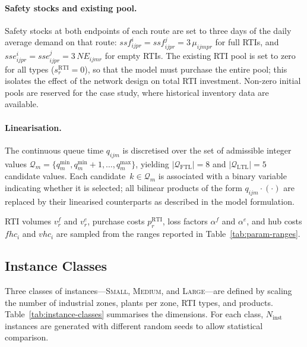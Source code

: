 \paragraph{Safety stocks and existing pool.}
Safety stocks at both endpoints of each route are set to three days
of the daily average demand on that route: $ssf^{i}_{ijpr} =
ssf^{j}_{ijpr} = 3\,\mu_{ijmpr}$ for full RTIs, and
$sse^{i}_{ijpr} = sse^{j}_{ijpr} = 3\,NE_{ijmr}$ for empty RTIs.
The existing RTI pool is set to zero for all types
($s^{\text{RTI}}_r = 0$), so that the model must purchase the
entire pool; this isolates the effect of the network design on
total RTI investment. Non-zero initial pools are reserved for the
case study, where historical inventory data are available.

\paragraph{Linearisation.}
The continuous queue time $q_{ijm}$ is discretised over the set of
admissible integer values
$\mathcal{Q}_m = \{q^{\min}_m, q^{\min}_m{+}1, \ldots,
q^{\max}_m\}$, yielding $|\mathcal{Q}_{\text{FTL}}| = 8$ and
$|\mathcal{Q}_{\text{LTL}}| = 5$ candidate values. Each
candidate~$k \in \mathcal{Q}_m$ is associated with a binary
variable indicating whether it is selected; all bilinear products
of the form $q_{ijm} \cdot (\cdot)$ are replaced by their
linearised counterparts as described in the model formulation.

RTI volumes $v^f_r$ and $v^e_r$, purchase costs $p^{\text{RTI}}_r$,
loss factors $\alpha^f$ and $\alpha^e$, and hub costs $fhc_i$ and
$vhc_i$ are sampled from the ranges reported in
Table~\ref{tab:param-ranges}.


\subsection{Instance Classes}
\label{sec:instance-classes}

Three classes of instances---\textsc{Small}, \textsc{Medium}, and
\textsc{Large}---are defined by scaling the number of industrial
zones, plants per zone, RTI types, and products.
Table~\ref{tab:instance-classes} summarises the dimensions.
For each class, $N_{\text{inst}}$ instances are generated with
different random seeds to allow statistical comparison.

